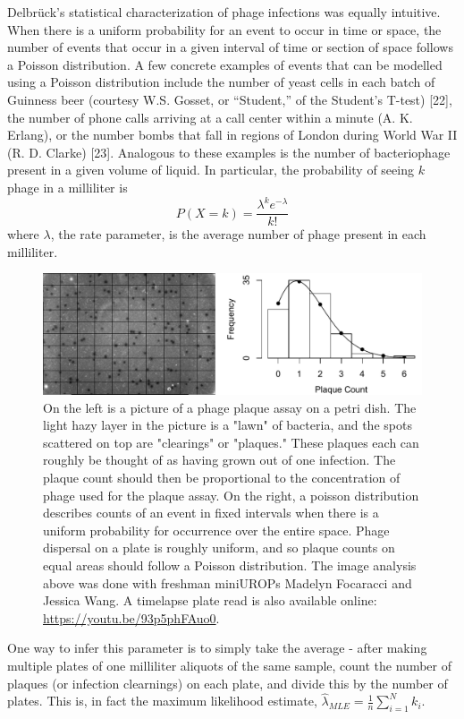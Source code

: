 \documentclass[12pt,twoside]{mitthesis-manusdown}
\begin{document}
Delbrück's statistical characterization of phage infections was equally
intuitive. When there is a uniform probability for an event to occur in
time or space, the number of events that occur in a given interval of
time or section of space follows a Poisson distribution. A few concrete
examples of events that can be modelled using a Poisson distribution
include the number of yeast cells in each batch of Guinness beer
(courtesy W.S. Gosset, or ``Student,'' of the Student's T-test)
{[}22{]}, the number of phone calls arriving at a call center within a
minute (A. K. Erlang), or the number bombs that fall in regions of
London during World War II (R. D. Clarke) {[}23{]}. Analogous to these
examples is the number of bacteriophage present in a given volume of
liquid. In particular, the probability of seeing \(k\) phage in a
milliliter is \[P( X = k ) = \frac{ \lambda^k e^{-\lambda} }{ k! }\]
where \(\lambda\), the rate parameter, is the average number of phage
present in each milliliter.
\begin{figure}[tb!]

{\centering \includegraphics[width=1\linewidth]{figuresintro/poissonThresholded} 

}

\caption{\label{fig:poisson}On the left is a picture of a phage plaque assay on a petri dish. The light hazy layer in the picture is a "lawn" of bacteria, and the spots scattered on top are "clearings" or "plaques." These plaques each can roughly be thought of as having grown out of one infection. The plaque count should then be proportional to the concentration of phage used for the plaque assay. On the right, a poisson distribution describes counts of an event in fixed intervals when there is a uniform probability for occurrence over the entire space. Phage dispersal on a plate is roughly uniform, and so plaque counts on equal areas should follow a Poisson distribution. The image analysis above was done with freshman miniUROPs Madelyn Focaracci and Jessica Wang. A timelapse plate read is also available online: \href{https://youtu.be/93p5phFAuo0}{https://youtu.be/93p5phFAuo0}.}\label{fig:poisson}
\end{figure}
One way to infer this parameter is to simply take the average - after
making multiple plates of one milliliter aliquots of the same sample,
count the number of plaques (or infection clearnings) on each plate, and
divide this by the number of plates. This is, in fact the maximum
likelihood estimate,
\(\hat{\lambda}_{MLE} = \frac{1}{n} \sum_{i=1}^{N} k_i\).
\end{document}
